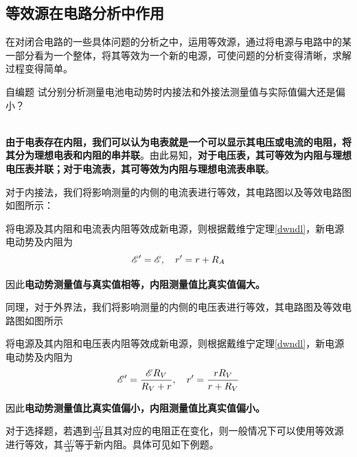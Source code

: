 \subsection{等效源在电路分析中作用}

在对闭合电路的一些具体问题的分析之中，运用等效源，通过将电源与电路中的某一部分看为一个整体，将其等效为一个新的电源，可使问题的分析变得清晰，求解过程变得简单。

\begin{ep}{自编题}{}
试分别分析测量电池电动势时内接法和外接法测量值与实际值偏大还是偏小？

~\\
\textbf{由于电表存在内阻，我们可以认为电表就是一个可以显示其电压或电流的电阻，将其分为理想电表和内阻的串并联}。由此易知，\textbf{对于电压表，其可等效为内阻与理想电压表并联；对于电流表，其可等效为内阻与理想电流表串联}。

对于内接法，我们将影响测量的内侧的电流表进行等效，其电路图以及等效电路图如图所示：



将电源及其内阻和电流表内阻等效成新电源，则根据戴维宁定理\eqref{dwndl}，新电源电动势及内阻为
$$ \mathscr{E}^{\prime} = \mathscr{E} ,\quad r^{\prime} = r + R_A $$

因此\textbf{电动势测量值与真实值相等，内阻测量值比真实值偏大。}

同理，对于外界法，我们将影响测量的内侧的电压表进行等效，其电路图及等效电路图如图所示



将电源及其内阻和电压表内阻等效成新电源，则根据戴维宁定理\eqref{dwndl}，新电源电动势及内阻为
$$ \mathscr{E}^{\prime} = \frac{ \mathscr{E} R_V}{R_V + r} ,\quad r^{\prime} = \frac{r R_V}{r + R_V} $$

因此\textbf{电动势测量值比真实值偏小，内阻测量值比真实值偏小。}
\end{ep}

对于选择题，若遇到$\frac{\Delta U}{\Delta I}$且其对应的电阻正在变化，则一般情况下可以使用等效源进行等效，其$\frac{\Delta U}{\Delta I}$等于新内阻。具体可见如下例题。

